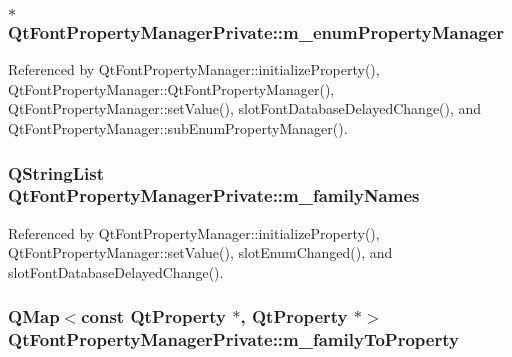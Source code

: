 \subsubsection[{m\+\_\+enum\+Property\+Manager}]{$\ast$ Qt\+Font\+Property\+Manager\+Private\+::m\+\_\+enum\+Property\+Manager}\label{classQtFontPropertyManagerPrivate_a93aeedee93e751580cf7e2b3edd654d2}


Referenced by Qt\+Font\+Property\+Manager\+::initialize\+Property(), Qt\+Font\+Property\+Manager\+::\+Qt\+Font\+Property\+Manager(), Qt\+Font\+Property\+Manager\+::set\+Value(), slot\+Font\+Database\+Delayed\+Change(), and Qt\+Font\+Property\+Manager\+::sub\+Enum\+Property\+Manager().

\subsubsection[{m\+\_\+family\+Names}]{\setlength{\rightskip}{0pt plus 5cm}Q\+String\+List Qt\+Font\+Property\+Manager\+Private\+::m\+\_\+family\+Names}\label{classQtFontPropertyManagerPrivate_a130efce528b8884b0f92c9c85186aa1f}


Referenced by Qt\+Font\+Property\+Manager\+::initialize\+Property(), Qt\+Font\+Property\+Manager\+::set\+Value(), slot\+Enum\+Changed(), and slot\+Font\+Database\+Delayed\+Change().

\subsubsection[{m\+\_\+family\+To\+Property}]{\setlength{\rightskip}{0pt plus 5cm}Q\+Map$<$const {\bf Qt\+Property} $\ast$, {\bf Qt\+Property} $\ast$$>$ Qt\+Font\+Property\+Manager\+Private\+::m\+\_\+family\+To\+Property}\label{classQtFontPropertyManagerPrivate_aafa8add700b8e281b275b535e9dabf39}


